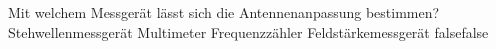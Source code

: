     {Mit welchem Messgerät lässt sich die Antennenanpassung bestimmen?}
    {Stehwellenmessgerät}
    {Multimeter}
    {Frequenzzähler}
    {Feldstärkemessgerät}
    {false}{false}